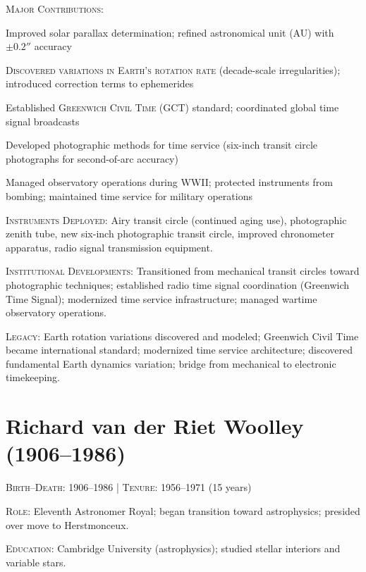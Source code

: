 \noindent\textsc{Major Contributions}:
\begin{enumerate*}[label=(\arabic*)]
\item Improved solar parallax determination; refined astronomical unit (AU) with $\pm 0.2''$ accuracy
\item \textsc{Discovered variations in Earth's rotation rate} (decade-scale irregularities); introduced correction terms to ephemerides
\item Established \textsc{Greenwich Civil Time (GCT)} standard; coordinated global time signal broadcasts
\item Developed photographic methods for time service (six-inch transit circle photographs for second-of-arc accuracy)
\item Managed observatory operations during WWII; protected instruments from bombing; maintained time service for military operations
\end{enumerate*}

\noindent\textsc{Instruments Deployed}: Airy transit circle (continued aging use), photographic zenith tube, new six-inch photographic transit circle, improved chronometer apparatus, radio signal transmission equipment.

\noindent\textsc{Institutional Developments}: Transitioned from mechanical transit circles toward photographic techniques; established radio time signal coordination (Greenwich Time Signal); modernized time service infrastructure; managed wartime observatory operations.

\noindent\textsc{Legacy}: Earth rotation variations discovered and modeled; Greenwich Civil Time became international standard; modernized time service architecture; discovered fundamental Earth dynamics variation; bridge from mechanical to electronic timekeeping.

\medskip

\section*{Richard van der Riet Woolley (1906--1986)}
\textsc{Birth--Death}: 1906--1986 | \textsc{Tenure}: 1956--1971 (15 years)

\noindent\textsc{Role}: Eleventh Astronomer Royal; began transition toward astrophysics; presided over move to Herstmonceux.

\noindent\textsc{Education}: Cambridge University (astrophysics); studied stellar interiors and variable stars.

